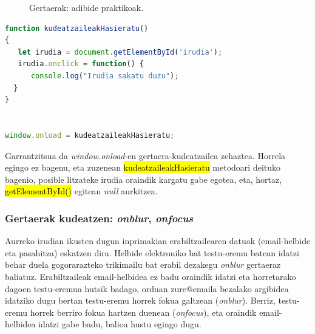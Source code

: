 \begin{figure}[ht]
	\centering
{}
\caption{Gertaerak: adibide praktikoak.}
\label{fig:gertaerakadibidepraktikoa}
\end{figure}




\begin{lstlisting}[language=JavaScript,numbers=none]
function kudeatzaileakHasieratu()
{
   let irudia = document.getElementById('irudia');
   irudia.onclick = function() {
      console.log("Irudia sakatu duzu");
  }
}


window.onload = kudeatzaileakHasieratu;
\end{lstlisting}

Garrantzitsua da \textit{window.onload}-en gertaera-kudeatzailea zehaztea. Horrela egingo ez bagenu, eta zuzenean \hl{kudeatzaileakHasieratu} metodoari deituko bagenio,
posible litzateke irudia oraindik kargatu gabe egotea, eta, hortaz, \hl{getElementById()} egitean \textit{null} aurkitzea.

\subsubsection{Gertaerak kudeatzen: \textit{onblur}, \textit{onfocus}}

Aurreko irudian ikusten dugun inprimakian erabiltzailearen datuak (email-helbide eta pasahitza) eskatzen dira. Helbide elektroniko bat testu-eremu batean idatzi behar duela gogorarazteko trikimailu bat erabil dezakegu \textit{onblur} gertaeraz baliatuz. Erabiltzaileak email-helbidea ez badu oraindik idatzi eta horretarako dagoen testu-eremua hutsik badago, orduan \textquotedbl{}zure@emaila\textquotedbl{} bezalako argibidea idatziko dugu bertan testu-eremu horrek fokua galtzean (\textit{onblur}). Berriz, testu-eremu horrek berriro fokua hartzen duenean (\textit{onfocus}), eta oraindik email-helbidea idatzi gabe badu, balioa hustu egingo dugu. 

